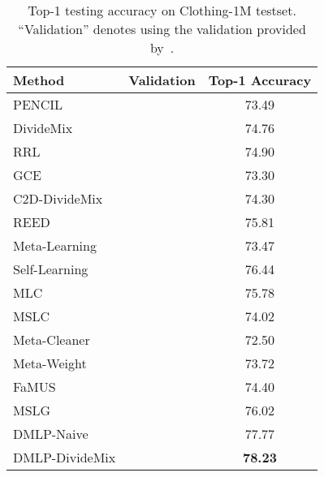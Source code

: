 \documentclass[10pt,twocolumn,letterpaper]{article}
\newcommand{\red}[1]{{#1}}
\begin{document}
\begin{table}
    \caption{Top-1 testing accuracy on Clothing-1M testset. \red{``Validation'' denotes using the validation provided by~\cite{Clothing1M}.}} 
    \vspace{-1em}
    \centering
    \footnotesize
    \begin{tabular}{l |c|c}
    \toprule        
        Method                          &  \red{Validation}           &  Top-1 Accuracy   \\ \midrule


        
        PENCIL~\cite{yi2019probabilistic}        &  \red{{\XSolidBrush}} &  73.49                 \\ 
        DivideMix~\cite{li2020dividemix}         &  \red{{\XSolidBrush}}  &  74.76                  \\ 
RRL~\cite{li2021learning}  & \red{{\XSolidBrush}} & 74.90            \\ 
        GCE~\cite{ghosh2021contrastive}  & \red{{\XSolidBrush}} & 73.30          \\ 
        C2D-DivideMix~\cite{zheltonozhskii2022contrast}  & \red{{\XSolidBrush}} & 74.30             \\ 
        REED ~\cite{zhang2020decoupling}        &   \red{{\XSolidBrush}}  &  75.81    \\ \midrule
        Meta-Learning~\cite{MLNT}                & \red{{\CheckmarkBold}}   &  73.47                 \\ 
        Self-Learning~\cite{han2019deep}         &  \red{{\CheckmarkBold}}  &  76.44                  \\
        MLC ~\cite{zheng2021meta}& \red{{\CheckmarkBold}} &75.78                  \\ 
        MSLC ~\cite{AAAI-2021-meta}&\red{{\CheckmarkBold}} & 74.02                  \\ 
        Meta-Cleaner~\cite{zhang2019metacleaner} &  \red{{\CheckmarkBold}}  &  72.50                 \\ 
        Meta-Weight~\cite{shu2019meta} &  \red{{\CheckmarkBold}} & 73.72 \\
FaMUS~\cite{xu2021faster} & \red{{\CheckmarkBold}} & 74.40 \\
        MSLG~\cite{algan2021meta} & \red{{\CheckmarkBold}} &76.02 \\
        \midrule
        DMLP-Naive                              &     \red{{\CheckmarkBold}}     &  77.77 \iffalse \textbf{77.31}\fi    \\
        DMLP-DivideMix                          &       \red{{\CheckmarkBold}}       &  \textbf{78.23}    \\     
        \bottomrule
    \end{tabular}
    \label{tab:clothing1M}
    \vspace{-2mm}
\end{table}
\end{document}
